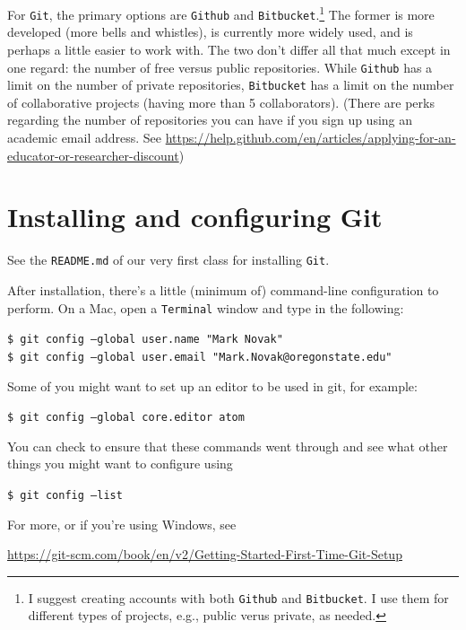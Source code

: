 \documentclass[12pt,letterpaper]{article}
\begin{document}
For \texttt{Git}, the primary options are \texttt{Github} and \texttt{Bitbucket}.\footnote{I suggest creating accounts with both \texttt{Github} and \texttt{Bitbucket}.  I use them for different types of projects, e.g., public verus private, as needed.}
The former is more developed (more bells and whistles), is currently more widely used, and is perhaps a little easier to work with.
The two don't differ all that much except in one regard:  the number of free versus public repositories.
While \texttt{Github} has a limit on the number of private repositories, \texttt{Bitbucket} has a limit on the number of collaborative projects (having more than 5 collaborators).
(There are perks regarding the number of repositories you can have if you sign up using an academic email address.  See \url{https://help.github.com/en/articles/applying-for-an-educator-or-researcher-discount})



\section{Installing and configuring Git}
See the \texttt{README.md} of our very first class for installing \texttt{Git}.

After installation, there's a little (minimum of) command-line configuration to perform.
On a Mac, open a \texttt{Terminal} window and type in the following:

\noindent
     \texttt{\$ git config --global user.name "Mark Novak"}\\
     \texttt{\$ git config --global user.email "Mark.Novak@oregonstate.edu"}

\noindent
Some of you might want to set up an editor to be used in git, for example:

\noindent
	\texttt{\$ git config --global core.editor atom}

\noindent
You can check to ensure that these commands went through and see what other things you might want to configure using

\noindent
\texttt{\$ git config --list}

\noindent
For more, or if you're using Windows, see\\
\begin{footnotesize}
\url{https://git-scm.com/book/en/v2/Getting-Started-First-Time-Git-Setup}
\end{footnotesize}
\end{document}
